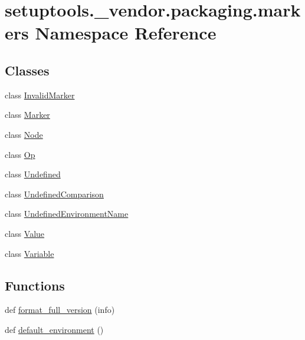 \hypertarget{namespacesetuptools_1_1__vendor_1_1packaging_1_1markers}{}\section{setuptools.\+\_\+vendor.\+packaging.\+markers Namespace Reference}
\label{namespacesetuptools_1_1__vendor_1_1packaging_1_1markers}
\subsection*{Classes}
\begin{DoxyCompactItemize}
\item 
class \hyperlink{classsetuptools_1_1__vendor_1_1packaging_1_1markers_1_1InvalidMarker}{Invalid\+Marker}
\item 
class \hyperlink{classsetuptools_1_1__vendor_1_1packaging_1_1markers_1_1Marker}{Marker}
\item 
class \hyperlink{classsetuptools_1_1__vendor_1_1packaging_1_1markers_1_1Node}{Node}
\item 
class \hyperlink{classsetuptools_1_1__vendor_1_1packaging_1_1markers_1_1Op}{Op}
\item 
class \hyperlink{classsetuptools_1_1__vendor_1_1packaging_1_1markers_1_1Undefined}{Undefined}
\item 
class \hyperlink{classsetuptools_1_1__vendor_1_1packaging_1_1markers_1_1UndefinedComparison}{Undefined\+Comparison}
\item 
class \hyperlink{classsetuptools_1_1__vendor_1_1packaging_1_1markers_1_1UndefinedEnvironmentName}{Undefined\+Environment\+Name}
\item 
class \hyperlink{classsetuptools_1_1__vendor_1_1packaging_1_1markers_1_1Value}{Value}
\item 
class \hyperlink{classsetuptools_1_1__vendor_1_1packaging_1_1markers_1_1Variable}{Variable}
\end{DoxyCompactItemize}
\subsection*{Functions}
\begin{DoxyCompactItemize}
\item 
def \hyperlink{namespacesetuptools_1_1__vendor_1_1packaging_1_1markers_ae9c8124133d5c113bfe9a21fb6b9cd04}{format\+\_\+full\+\_\+version} (info)
\item 
def \hyperlink{namespacesetuptools_1_1__vendor_1_1packaging_1_1markers_a9fa619979508af28a6c53b0b61c3ae15}{default\+\_\+environment} ()
\end{DoxyCompactItemize}
